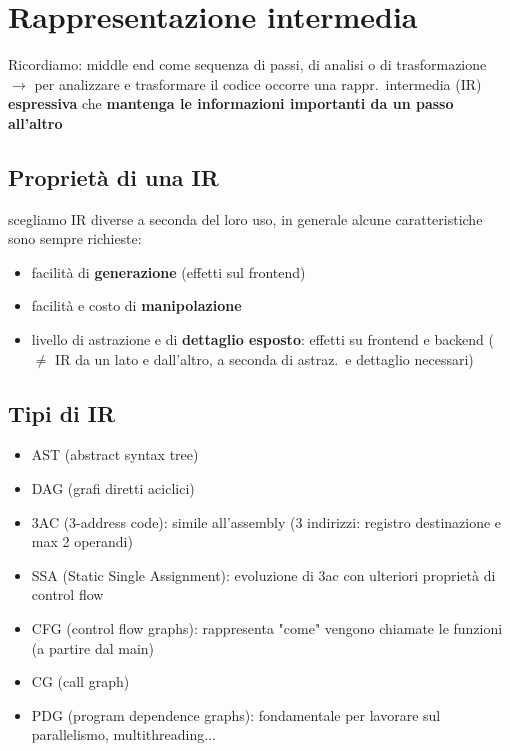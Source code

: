 \vspace{-2em}
\section{Rappresentazione intermedia}

Ricordiamo: middle end come sequenza di passi, di analisi o di trasformazione $\rightarrow$ per analizzare e trasformare il codice occorre una rappr.~intermedia (IR) \textbf{espressiva} che \textbf{mantenga le informazioni importanti da un passo all'altro}

\vspace{-1em}
\subsection{Propriet\`a di una IR}

scegliamo IR diverse a seconda del loro uso, in generale alcune caratteristiche sono sempre richieste:
\begin{itemize}
  \item facilit\`a di \textbf{generazione} (effetti sul frontend)
  \item facilit\`a e costo di \textbf{manipolazione}
  \item livello di astrazione e di \textbf{dettaglio esposto}: effetti su frontend e backend ($\neq$ IR da un lato e dall'altro, a seconda di astraz.~e dettaglio necessari)
\end{itemize}

\vspace{-1em}
\subsection{Tipi di IR}

\begin{itemize}
  \item AST (abstract syntax tree)
  \item DAG (grafi diretti aciclici)
  \item 3AC (3-address code): simile all'assembly (3 indirizzi: registro destinazione e max 2 operandi)
  \item SSA (Static Single Assignment): evoluzione di 3ac con ulteriori propriet\`a di control flow
  \item CFG (control flow graphs): rappresenta "come" vengono chiamate le funzioni (a partire dal main)
  \item CG (call graph)
  \item PDG (program dependence graphs): fondamentale per lavorare sul parallelismo, multithreading...
\end{itemize}

